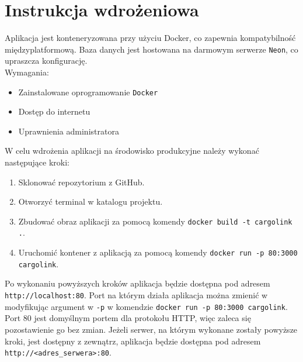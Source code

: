 \chapter{Instrukcja wdrożeniowa}
Aplikacja jest konteneryzowana przy użyciu Docker, co zapewnia kompatybilność międzyplatformową. Baza danych jest hostowana na darmowym serwerze \texttt{Neon}, co upraszcza konfigurację. \\
Wymagania:
\begin{itemize}
    \item Zainstalowane oprogramowanie \texttt{Docker}
    \item Dostęp do internetu
    \item Uprawnienia administratora
\end{itemize}
W celu wdrożenia aplikacji na środowisko produkcyjne należy wykonać następujące kroki:
\begin{enumerate}
    \item Sklonować repozytorium z GitHub.
    \item Otworzyć terminal w katalogu projektu.
    \item Zbudować obraz aplikacji za pomocą komendy \texttt{docker build -t cargolink .}.
    \item Uruchomić kontener z aplikacją za pomocą komendy \texttt{docker run -p 80:3000 cargolink}.
\end{enumerate}

Po wykonaniu powyższych kroków aplikacja będzie dostępna pod adresem \texttt{http://localhost:80}. Port na którym działa aplikacja można zmienić w modyfikując argument w \texttt{-p} w komendzie \texttt{docker run -p 80:3000 cargolink}. Port 80 jest domyślnym portem dla protokołu HTTP, więc zaleca się pozostawienie go bez zmian. Jeżeli serwer, na którym wykonane zostały powyższe kroki, jest dostępny z zewnątrz, aplikacja będzie dostępna pod adresem \texttt{http://<adres\_serwera>:80}.